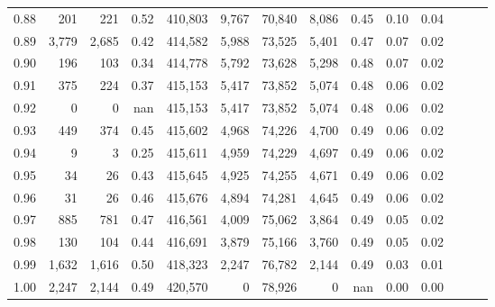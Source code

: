 \begin{tabular}{rrrrrrrrrrrrrr}
0.88 &     201 &    221 &  0.52 &  410,803 &    9,767 &  70,840 &   8,086 &  0.45 &  0.10 &      0.04 \\
0.89 &   3,779 &  2,685 &  0.42 &  414,582 &    5,988 &  73,525 &   5,401 &  0.47 &  0.07 &      0.02 \\
0.90 &     196 &    103 &  0.34 &  414,778 &    5,792 &  73,628 &   5,298 &  0.48 &  0.07 &      0.02 \\
0.91 &     375 &    224 &  0.37 &  415,153 &    5,417 &  73,852 &   5,074 &  0.48 &  0.06 &      0.02 \\
0.92 &       0 &      0 &   nan &  415,153 &    5,417 &  73,852 &   5,074 &  0.48 &  0.06 &      0.02 \\
0.93 &     449 &    374 &  0.45 &  415,602 &    4,968 &  74,226 &   4,700 &  0.49 &  0.06 &      0.02 \\
0.94 &       9 &      3 &  0.25 &  415,611 &    4,959 &  74,229 &   4,697 &  0.49 &  0.06 &      0.02 \\
0.95 &      34 &     26 &  0.43 &  415,645 &    4,925 &  74,255 &   4,671 &  0.49 &  0.06 &      0.02 \\
0.96 &      31 &     26 &  0.46 &  415,676 &    4,894 &  74,281 &   4,645 &  0.49 &  0.06 &      0.02 \\
0.97 &     885 &    781 &  0.47 &  416,561 &    4,009 &  75,062 &   3,864 &  0.49 &  0.05 &      0.02 \\
0.98 &     130 &    104 &  0.44 &  416,691 &    3,879 &  75,166 &   3,760 &  0.49 &  0.05 &      0.02 \\
0.99 &   1,632 &  1,616 &  0.50 &  418,323 &    2,247 &  76,782 &   2,144 &  0.49 &  0.03 &      0.01 \\
1.00 &   2,247 &  2,144 &  0.49 &  420,570 &        0 &  78,926 &       0 &   nan &  0.00 &      0.00 \\
\bottomrule
\end{tabular}
